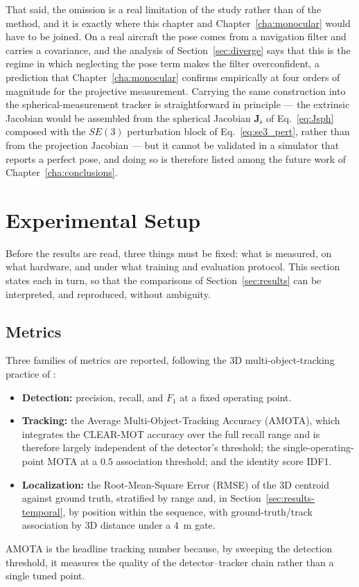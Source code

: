 That said, the omission is a real limitation of the study rather than of the
method, and it is exactly where this chapter and Chapter~\ref{cha:monocular} would
have to be joined. On a real aircraft the pose comes from a navigation filter and
carries a covariance, and the analysis of Section~\ref{sec:diverge} says that this
is the regime in which neglecting the pose term makes the filter overconfident,
a prediction that Chapter~\ref{cha:monocular} confirms empirically at four orders
of magnitude for the projective measurement. Carrying the same construction into
the spherical-measurement tracker is straightforward in principle --- the
extrinsic Jacobian would be assembled from the spherical Jacobian
$\bm{J}_{\mathrm{s}}$ of Eq.~\eqref{eq:Jsph} composed with the $SE(3)$
perturbation block of Eq.~\eqref{eq:se3_pert}, rather than from the projection
Jacobian --- but it cannot be validated in a simulator that reports a perfect
pose, and doing so is therefore listed among the future work of
Chapter~\ref{cha:conclusions}.

\section{Experimental Setup}
\label{sec:setup}

Before the results are read, three things must be fixed: what is measured, on what
hardware, and under what training and evaluation protocol. This section states
each in turn, so that the comparisons of Section~\ref{sec:results} can be
interpreted, and reproduced, without ambiguity.

\subsection{Metrics}

Three families of metrics are reported, following the 3D multi-object-tracking
practice of :
\begin{itemize}
  \item \textbf{Detection:} precision, recall, and $F_1$ at a fixed operating
  point.
  \item \textbf{Tracking:} the Average Multi-Object-Tracking Accuracy (AMOTA),
  which integrates the CLEAR-MOT accuracy over the full recall range and is
  therefore largely independent of the detector's threshold; the
  single-operating-point MOTA at a $0.5$ association threshold; and the identity
  score IDF1.
  \item \textbf{Localization:} the Root-Mean-Square Error (RMSE) of the 3D
  centroid against ground truth, stratified by range and, in
  Section~\ref{sec:results-temporal}, by position within the sequence, with
  ground-truth/track association by 3D distance under a $4$~m gate.
\end{itemize}
AMOTA is the headline tracking number because, by sweeping the detection
threshold, it measures the quality of the detector--tracker chain rather than a
single tuned point.

